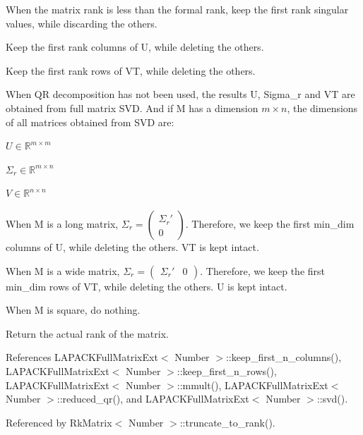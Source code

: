 \begin{DoxyDescription}
When the matrix rank is less than the formal rank, keep the first {\ttfamily rank} singular values, while discarding the others.

Keep the first {\ttfamily rank} columns of {\ttfamily U}, while deleting the others.

Keep the first {\ttfamily rank} rows of {\ttfamily VT}, while deleting the others.

When QR decomposition has not been used, the results {\ttfamily U}, {\ttfamily Sigma\+\_\+r} and {\ttfamily VT} are obtained from full matrix S\+VD. And if {\ttfamily M} has a dimension $m \times n$, the dimensions of all matrices obtained from S\+VD are\+:
\begin{DoxyItemize}
\item $U \in \mathbb{R}^{m \times m}$
\item $\Sigma_r \in \mathbb{R}^{m \times n}$
\item $V \in \mathbb{R}^{n \times n}$
\end{DoxyItemize}

When {\ttfamily M} is a long matrix, $\Sigma_r = \begin{pmatrix}\Sigma_r' \\ 0 \end{pmatrix}$. Therefore, we keep the first {\ttfamily min\+\_\+dim} columns of {\ttfamily U}, while deleting the others. {\ttfamily VT} is kept intact.

When {\ttfamily M} is a wide matrix, $\Sigma_r = \begin{pmatrix} \Sigma_r' & 0 \end{pmatrix}$. Therefore, we keep the first {\ttfamily min\+\_\+dim} rows of {\ttfamily VT}, while deleting the others. {\ttfamily U} is kept intact.

When {\ttfamily M} is square, do nothing.

Return the actual rank of the matrix.


\end{DoxyDescription}

References L\+A\+P\+A\+C\+K\+Full\+Matrix\+Ext$<$ Number $>$\+::keep\+\_\+first\+\_\+n\+\_\+columns(), L\+A\+P\+A\+C\+K\+Full\+Matrix\+Ext$<$ Number $>$\+::keep\+\_\+first\+\_\+n\+\_\+rows(), L\+A\+P\+A\+C\+K\+Full\+Matrix\+Ext$<$ Number $>$\+::mmult(), L\+A\+P\+A\+C\+K\+Full\+Matrix\+Ext$<$ Number $>$\+::reduced\+\_\+qr(), and L\+A\+P\+A\+C\+K\+Full\+Matrix\+Ext$<$ Number $>$\+::svd().



Referenced by Rk\+Matrix$<$ Number $>$\+::truncate\+\_\+to\+\_\+rank().

